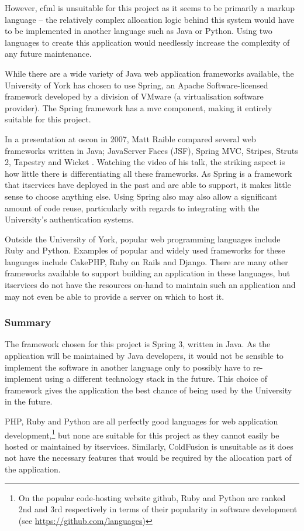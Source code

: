 However, \gls{cfml} is unsuitable for this project as it seems to be primarily
a markup language -- the relatively complex allocation logic behind this
system would have to be implemented in another language such as Java or
Python. Using two languages to create this application would needlessly
increase the complexity of any future maintenance.

\mynobreakpar

While there are a wide variety of Java web application frameworks available,
the University of York has chosen to use Spring, an Apache Software-licensed
framework developed by a division of VMware (a virtualisation software
provider). The Spring framework has a \gls{mvc} component, making it entirely
suitable for this project.

In a presentation at \gls{oscon} in 2007, Matt Raible compared several web
frameworks written in Java; JavaServer Faces (JSF), Spring MVC, Stripes,
Struts 2, Tapestry and Wicket \cite{raible2007javawebframeworks}. Watching the
video of his talk, the striking aspect is how little there is differentiating
all these frameworks. As Spring is a framework that \gls{itservices} have
deployed in the past and are able to support, it makes little sense to choose
anything else. Using Spring also may also allow a significant amount of code
reuse, particularly with regards to integrating with the University's
authentication systems.

\mynobreakpar

Outside the University of York, popular web programming languages include Ruby
and Python. Examples of popular and widely used frameworks for these languages
include CakePHP, Ruby on Rails and Django. There are many other frameworks
available to support building an application in these languages, but
\gls{itservices} do not have the resources on-hand to maintain such an
application and may not even be able to provide a server on which to host it.

\subsubsection{Summary}

The framework chosen for this project is Spring 3, written in Java. As the
application will be maintained by Java developers, it would not be sensible to
implement the software in another language only to possibly have to
re-implement using a different technology stack in the future. This choice of
framework gives the application the best chance of being used by the
University in the future.

PHP, Ruby and Python are all perfectly good languages for web application
development,\footnote{On the popular code-hosting website \gls{github}, Ruby
and Python are ranked 2nd and 3rd respectively in terms of their popularity in
software development (see \url{https://github.com/languages})} but none are
suitable for this project as they cannot easily be hosted or maintained by
\gls{itservices}. Similarly, ColdFusion is unsuitable as it does not have the
necessary features that would be required by the allocation part of the
application.
